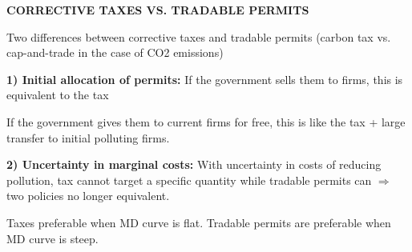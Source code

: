 \documentclass[landscape]{slides}
\begin{document}
%
%
%
%
%
%
%
%
%
%
%
%
%
%
%
%
%
%
%
%

\begin{slide}
\begin{center}
{\bf CORRECTIVE TAXES VS. TRADABLE PERMITS}
\end{center}
Two differences between corrective taxes and tradable permits (carbon tax vs. cap-and-trade
in the case of CO2 emissions)

\textbf{1) Initial allocation of permits:}
If the government sells them to firms, this is equivalent to the tax

If the government gives them to current firms for free, this is like the
tax + large transfer to initial polluting firms.


\textbf{2) Uncertainty in marginal costs:} With uncertainty in costs of reducing pollution,
tax cannot target a specific quantity while tradable permits can
$\Rightarrow$ two policies no longer equivalent.

Taxes preferable when MD curve is flat.
Tradable permits are preferable when MD curve
is steep.


\end{slide}
\end{document}
